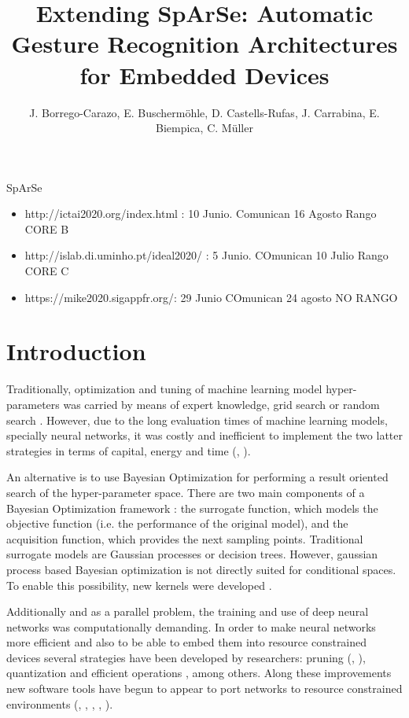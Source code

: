 \documentclass[a4paper, twocolumn]{article}
\title{Extending SpArSe: Automatic Gesture Recognition Architectures for Embedded Devices}
\author{J. Borrego-Carazo, E. Buscherm\"ohle, D. Castells-Rufas, J. Carrabina, E. Biempica, C. M\"uller}
\date{}
\begin{document}
\maketitle
\abstract
SpArSe
\begin{itemize}
	\item http://ictai2020.org/index.html : 10 Junio. Comunican 16 Agosto Rango CORE B
	\item http://islab.di.uminho.pt/ideal2020/ : 5 Junio. COmunican 10 Julio Rango CORE C
	\item https://mike2020.sigappfr.org/: 29 Junio COmunican 24 agosto NO RANGO
\end{itemize}
\section{Introduction}

Traditionally, optimization and tuning of machine learning model hyper-parameters was carried by means of expert knowledge, grid search or random search \cite{Bergstra2012}. However, due to the long evaluation times of machine learning models, specially neural networks, it was costly and inefficient to implement the two latter strategies in terms of capital, energy and time (\cite{Zoph2016}, \cite{Zoph2018}).

An alternative is to use Bayesian Optimization \cite{Mockus1978} for performing a result oriented search of the hyper-parameter space. There are two main components of a Bayesian Optimization framework \cite{Frazier2018}: the surrogate function, which models the objective function (i.e. the performance of the original model), and the acquisition function, which provides the next sampling points. Traditional surrogate models are Gaussian processes or decision trees. However, gaussian process based Bayesian optimization is not directly suited for conditional spaces. To enable this possibility, new kernels were developed \cite{Swersky2014}.

Additionally and as a parallel problem, the training and use of deep neural networks was computationally demanding. In order to make neural networks more efficient and also to be able to embed them into resource constrained devices several strategies have been developed by researchers: pruning (\cite{Han2015}, \cite{Cun:1990:OBD:109230.109298}), quantization \cite{Jacob2017} and efficient operations \cite{Howard2017}, among others. Along these improvements new software tools have begun to appear to port networks to resource constrained environments (\cite{TFLite}, \cite{Rotem2018}, \cite{ARMNN}, \cite{TensorRT}, \cite{uTensor}).
\end{document}
